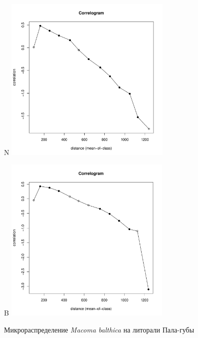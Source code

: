 \documentclass[12pt, a4paper]{disser}
\begin{document}
	\begin{figure}[h]

	\begin{minipage}[b]{.5\linewidth}
	\begin{center}
	{\small N}
		\includegraphics[width=80mm]{../Barenc_Sea/distribution_Moran/Pala_moran_N_Macoma_balthica_.pdf}
	\end{center}
	\end{minipage}
	\hfil %
	\begin{minipage}[b]{.5\linewidth}
	\begin{center}
	{\small B}
		\includegraphics[width=80mm]{../Barenc_Sea/distribution_Moran/Pala_moran_B_Macoma_balthica_.pdf}
	\end{center}
	\end{minipage}
	\caption{Микрораспределение {\it Macoma balthica} на литорали Пала-губы}
	\label{ris:moransI_Pala_Macoma}
	\end{figure}
\end{document}
